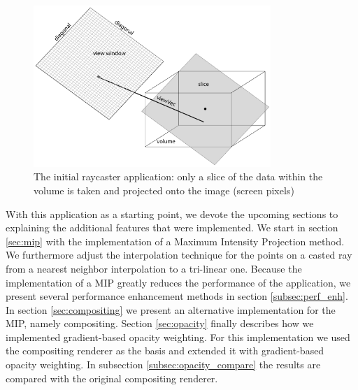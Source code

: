 \begin{figure}[h!]
    \centering
    \captionsetup{justification=centering,margin=0.5cm}
    \includegraphics[width=0.8\textwidth]{img/raycaster0.pdf}
    \caption{The initial raycaster application: only a slice of the data within the volume is taken and projected onto the image (screen pixels)}
    \label{fig:raycaster0}
\end{figure}

\newpage

With this application as a starting point, we devote the upcoming sections to explaining the additional features that were implemented. We start in section \ref{sec:mip} with the implementation of a Maximum Intensity Projection method. We furthermore adjust the interpolation technique for the points on a casted ray from a nearest neighbor interpolation to a tri-linear one. Because the implementation of a MIP greatly reduces the performance of the application, we present several performance enhancement methods in section \ref{subsec:perf_enh}. In section \ref{sec:compositing} we present an alternative implementation for the MIP, namely compositing. Section \ref{sec:opacity} finally describes how we implemented gradient-based opacity weighting. For this implementation we used the compositing renderer as the basis and extended it with gradient-based opacity weighting. In subsection \ref{subsec:opacity_compare} the results are compared with the original compositing renderer.
